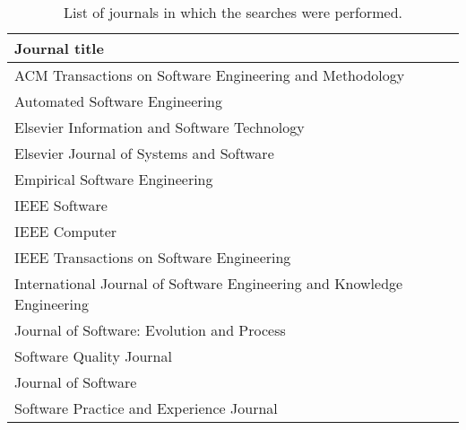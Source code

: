 \begin{table}[htp]
	\caption{List of journals in which the searches were performed.}
	\label{tbl:journals_list}
	\centering
	\begin{tabular}{l}
	\toprule
	\textbf{Journal title} \\
	\toprule
	ACM Transactions on Software Engineering and Methodology \\
	Automated Software Engineering \\
	Elsevier Information and Software Technology \\
	Elsevier Journal of Systems and Software \\
	Empirical Software Engineering \\
	IEEE Software \\
	IEEE Computer \\
	IEEE Transactions on Software Engineering \\
	International Journal of Software Engineering and Knowledge Engineering \\
	Journal of Software: Evolution and Process \\
	Software Quality Journal \\
	Journal of Software \\
	Software Practice and Experience Journal \\
	\bottomrule
	\end{tabular}
\end{table}